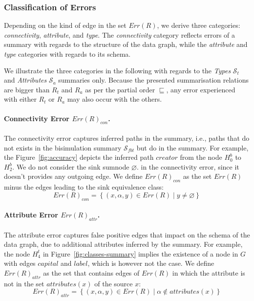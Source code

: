 \subsubsection{Classification of Errors}

Depending on the kind of edge in the set $Err(R)$, we derive three categories: \emph{connectivity}, \emph{attribute}, and \emph{type}. The \emph{connectivity} category reflects errors of a summary with regards to the structure of the data graph, while the \emph{attribute} and \emph{type} categories with regards to its schema.

We illustrate the three categories in the following with regards to the \emph{Types} $\mathcal{S}_t$ and \emph{Attributes} $\mathcal{S}_a$ summaries only. Because the presented summarisation relations are bigger than $R_t$ and $R_a$ as per the partial order $\sqsubseteq$, any error experienced with either $R_t$ or $R_a$ may also occur with the others.

\paragraph{Connectivity Error $Err(R)_{con}$.}

The connectivity error captures inferred paths in the summary, i.e., paths that do not exists in the bisimulation summary $\mathcal{S}_{fbt}$ but do in the summary. For example, the Figure~\ref{fig:accuracy} depicts the inferred path $creator$ from the node $H^b_0$ to $H^b_2$.
We do not consider the sink sumnode $\varnothing$. in the connectivity error, since it doesn't provides any outgoing edge. We define $Err(R)_{con}$ as the set $Err(R)$ minus the edges leading to the sink equivalence class:
$$
Err(R)_{con} = \left\lbrace (x, \alpha, y) \in Err(R) \mid y \neq \varnothing \right\rbrace
$$

\paragraph{Attribute Error $Err(R)_{attr}$.}

The attribute error captures false positive edges that impact on the schema of the data graph, due to additional attributes inferred by the summary. For example, the node $H^t_4$ in Figure~\ref{fig:classes-summary} implies the existence of a node in $G$ with edges $capital$ and $label$, which is however not the case. We define $Err(R)_{attr}$ as the set that contains edges of $Err(R)$ in which the attribute is not in the set $attributes(x)$ of the source $x$:
$$
Err(R)_{attr} = \left\lbrace (x, \alpha, y) \in Err(R) \mid \alpha \not \in attributes(x) \right\rbrace
$$

